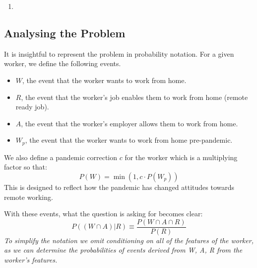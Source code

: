 \begin{enumerate}[label={2.\arabic*.}]
                \item {} 
            \end{enumerate}
      
             
        \subsection{Analysing the Problem}  \label{analysis}
           It is insightful to represent the problem in probability notation.
            For a given worker, we define the following events.
            \begin{itemize}
                \item $W$, the event that the worker wants to work from home.
                \item $R$, the event that the worker's job enables them to work from home (remote ready job).
                \item $A$, the event that the worker's employer allows them to work from home. 
                \item $W_p$, the event that the worker wants to work from home pre-pandemic.
            \end{itemize}           
            We also define a pandemic correction $c$ for the worker which is a multiplying factor so that:
            \begin{equation}
                P(W) = \min{(1,c \cdot P(W_p))}
            \end{equation}
            This is designed to reflect how the pandemic has changed attitudes towards remote working. 
            
            With these events, what the question is asking for becomes clear:
            \begin{equation}
                P((W \cap A) | R) \equiv \frac{P(W \cap A \cap R)}{P(R)}
            \end{equation}
           \textit{To simplify the notation we omit conditioning on all of the features of the worker, as we can determine the probabilities of events derived from W, A, R from the worker's features.}\\
           
